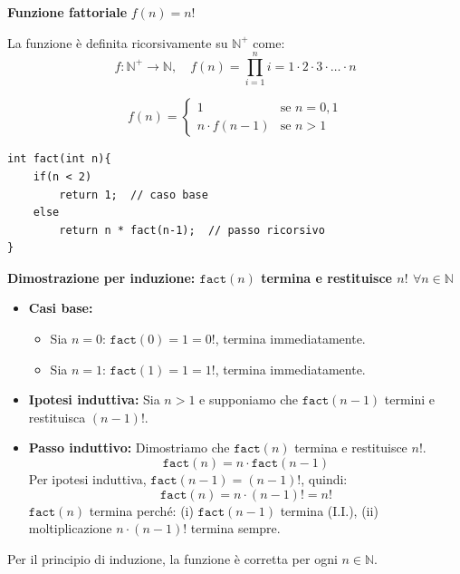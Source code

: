 \begin{esempio}
\textbf{Funzione fattoriale} $f(n) = n!$

La funzione è definita ricorsivamente su $\mathbb{N}^+$ come:
\[
f: \mathbb{N}^+ \to \mathbb{N}, \quad f(n) = \prod_{i=1}^n i = 1 \cdot 2 \cdot 3 \cdot \ldots \cdot n
\]

\[
f(n)= 
\begin{cases}
    1  & \text{se } n = 0,1 \\
    n \cdot f(n-1)  & \text{se } n > 1
\end{cases}
\]

\begin{tcolorbox}[
    colback=backcolour, 
    colframe=framegray, 
    boxrule=0.5pt, 
    sharp corners,
    left=5mm, right=5mm, 
    top=5mm, bottom=5mm,
    width=\linewidth
]
\begin{lstlisting}
int fact(int n){
    if(n < 2)
        return 1;  // caso base
    else 
        return n * fact(n-1);  // passo ricorsivo
}
\end{lstlisting}
\end{tcolorbox}


\textbf{Dimostrazione per induzione: $\texttt{fact}(n)$ termina e restituisce $n!$ $\forall n \in \mathbb{N}$}

\begin{itemize}
    \item \textbf{Casi base:} 
    \begin{itemize}
        \item Sia $n=0$: $\texttt{fact}(0)=1=0!$, termina immediatamente.
        \item Sia $n=1$: $\texttt{fact}(1)=1=1!$, termina immediatamente.
    \end{itemize}
    
    \item \textbf{Ipotesi induttiva:} Sia $n>1$ e supponiamo che $\texttt{fact}(n-1)$ termini e restituisca $(n-1)!$.
    
    \item \textbf{Passo induttivo:} Dimostriamo che $\texttt{fact}(n)$ termina e restituisce $n!$.
    \[
    \texttt{fact}(n) = n \cdot \texttt{fact}(n-1)
    \]
    Per ipotesi induttiva, $\texttt{fact}(n-1)=(n-1)!$, quindi:
    \[
    \texttt{fact}(n) = n \cdot (n-1)! = n!
    \]
    $\texttt{fact}(n)$ termina perché: (i) $\texttt{fact}(n-1)$ termina (I.I.), (ii) moltiplicazione $n \cdot (n-1)!$ termina sempre.
\end{itemize}

Per il principio di induzione, la funzione è corretta per ogni $n \in \mathbb{N}$.



\end{esempio}




